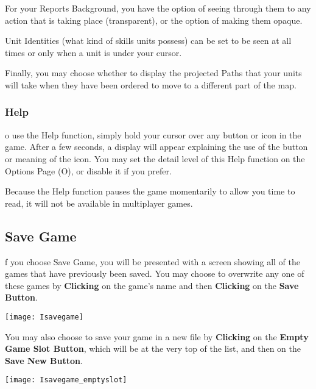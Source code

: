For your Reports Background, you have the option of seeing through them to any action that is taking place (transparent), or the option of making them opaque.

Unit Identities (what kind of skills units possess) can be set to be seen at all times or only when a unit is under your cursor.

Finally, you may choose whether to display the projected Paths that your units will take when they have been ordered to move to a different part of the map.

\subsubsection{\textsf{Help}}


o use the Help function, simply hold your cursor over any button or icon in the game. After a few seconds, a display will appear explaining the use of the button or meaning of the icon. You may set the detail level of this Help function on the Options Page (O), or disable it if you prefer.

Because the Help function pauses the game momentarily to allow you time to read, it will not be available in multiplayer games.

\subsection{\textsf{Save Game}}


f you choose Save Game, you will be presented with a screen showing all of the games that have previously been saved. You may choose to overwrite any one of these games by \textbf{Clicking} on the game’s name and then \textbf{Clicking} on the \textbf{Save Button}.

\begin{center}
    \texttt{[image: Isavegame]} %
\end{center}

You may also choose to save your game in a new file by \textbf{Clicking} on the \textbf{Empty Game Slot Button}, which will be at the very top of the list, and then on the \textbf{Save New Button}.

\begin{center}
    \texttt{[image: Isavegame\_emptyslot]} %
\end{center}

